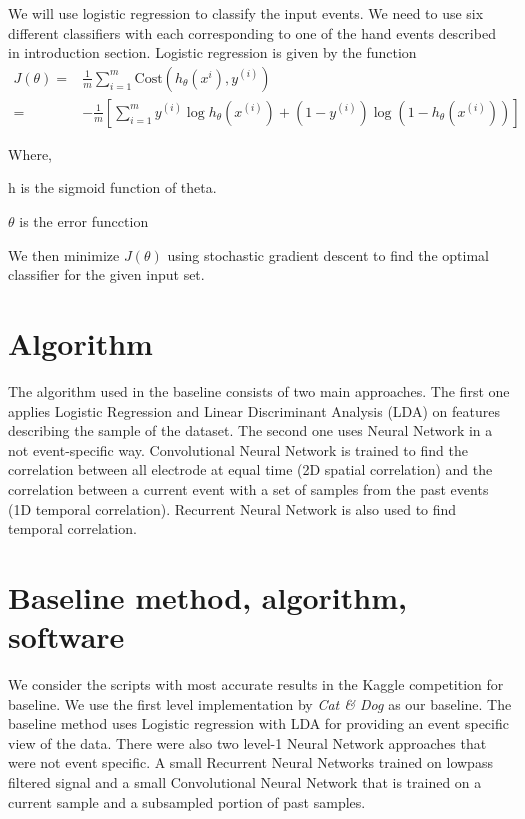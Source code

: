 \documentclass[final,leqno,onefignum,onetabnum]{siamltexmm}
\begin{document}
We will use logistic regression to classify the input events.  We need to use six different classifiers with each corresponding to one of the hand events described in introduction section.  Logistic regression is given by the function
\begin{align*}
  J(\theta) = & \frac{1}{m} \sum_{i = 1}^{m} \mathrm{Cost}(h_{\theta}(x^{i}), y^{(i)}) \\
  = & -\frac{1}{m} [\sum_{i=1}^{m} y^{(i)} \log{h_{\theta}(x^{(i)} )} + (1 - y^{(i)}) \log{( 1 - h_{\theta}(x^{(i)}) )}]
\end{align*}

Where,

h is the sigmoid function of theta.

\(\theta\) is the error funcction

We then minimize \(J(\theta)\) using stochastic gradient descent to find the optimal classifier for the given input set.

\section{Algorithm}
The algorithm used in the baseline consists of two main approaches. The first one applies Logistic Regression and Linear Discriminant Analysis (LDA) on features describing the sample of the dataset. The second one uses Neural Network in a not event-specific way. Convolutional Neural Network is trained to find the correlation between all electrode at equal time (2D spatial correlation) and the correlation between a current event with a set of samples from the past events (1D temporal correlation). Recurrent Neural Network is also used to find temporal correlation.


\section{Baseline method, algorithm, software}
We consider the scripts with most accurate results in the Kaggle competition for baseline\cite{kaggleleaderboard}.  We use the first level implementation by \textit{Cat \& Dog}\cite{kagglewinners} as our baseline.
The baseline method uses Logistic regression with LDA for providing an event specific view of the data.  There were also two level-1 Neural Network approaches that were not event specific.
A small Recurrent Neural Networks trained on lowpass filtered signal and a small Convolutional Neural Network that is trained on a current sample and a subsampled portion of past samples.
\end{document}
